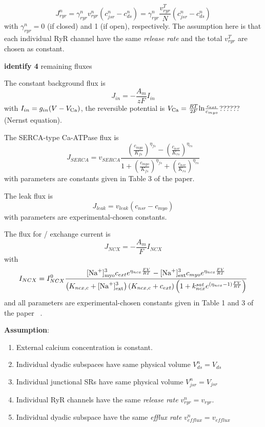 \begin{equation}
  \label{eq:174}
  J^n_{ryr} = \gamma^n_{ryr} v^n_{ryr} (c^n_{jsr} -
  c^n_{ds}) = \gamma^n_{ryr} \frac{v^T_{ryr}}{N} (c^n_{jsr} - c^n_{ds})
\end{equation}
with $\gamma^n_{ryr} = 0$ (if closed) and 1 (if open),
respectively. The assumption here is that each individual RyR channel
have the same {\it release rate} and the total $v^T_{ryr}$ are chosen as constant.

{\bf identify 4} remaining fluxes

The constant background  flux is
\begin{equation}
  \label{eq:189}
  J_{in} = -\frac{A_m}{zF}I_{in}
\end{equation}
with $I_{in} = g_{in} (V-V_{\ce{Ca}})$, the reversible potential is
$V_{\ce{Ca}} = \frac{RT}{2F}\ln\frac{c_{ext}}{c_{myo}}$?????? (Nernst equation).

The SERCA-type Ca-ATPase flux is
\begin{equation}
  \label{eq:190}
  J_{SERCA} = v_{SERCA} \frac{\left( \frac{c_{myo}}{K_{fs}}
    \right)^{\eta_{fs}} - \left( \frac{c_{nsr}}{K_{rs}}
    \right)^{\eta_{rs}}} {1 + \left( \frac{c_{myo}}{K_{fs}}
    \right)^{\eta_{fs}} + \left( \frac{c_{nsr}}{K_{rs}} \right)^{\eta_{rs}}}
\end{equation}
with parameters are constants given in Table 3 of the paper.


The leak  flux is
\begin{equation}
  \label{eq:191}
  J_{leak} = v_{leak} (c_{nsr}-c_{myo})
\end{equation}
with parameters are experimental-chosen constants.

The flux for / exchange current is
\begin{equation}
  \label{eq:192}
  J_{NCX} = -\frac{A_m}{F}I_{NCX}
\end{equation}
with 
\begin{eqnarray}
  \label{eq:199}
  I_{NCX} = I^0_{NCX} \frac{
    \ce{[Na+]^3_{myo}} c_{ext} e^{\eta_{ncx}\frac{FV}{RT}} - \ce{[Na+]^3_{ext}}c_{myo} e^{\eta_{ncx}\frac{FV}{RT}} 
  }{ 
    \left( K_{ncx,c}+\ce{[Na+]^3_{ext}}  \right) (K_{ncx,c} + c_{ext})
    \left( 1+ k^{sat}_{ncx} e^{(\eta_{ncx}-1)\frac{FV}{RT}}     \right)
  }
\end{eqnarray}
and all parameters are experimental-chosen constants given in Table 1
and 3 of the paper ~\citep{williams2007pda}.

{\bf Assumption}:
\begin{enumerate}
\item External calcium concentration is constant.
\item Individual dyadic subspaces have same physical volume
  $V^n_{ds}=V_{ds}$
\item Individual junctional SRs have same physical volume
  $V^n_{jsr}=V_{jsr}$
\item Individual RyR channels have the same {\it release rate}
  $v^n_{ryr} = v_{ryr}$.
\item Individual dyadic subspace have the same {\it efflux rate}
  $v^n_{efflux} = v_{efflux}$

\end{enumerate}

